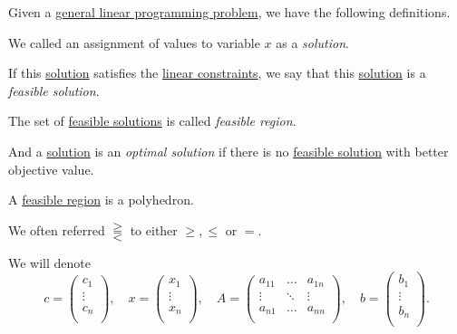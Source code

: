 Given a \hyperref[def:general-linear-programming-problem]{general linear programming problem}, we have the following definitions.
\begin{definition}\label{def:solution-of-a-general-linear-programming-problem}
	We called an assignment of values to variable \(x\) as a \emph{solution}.

	\begin{definition}\label{def:feasible-solution}
		If this \hyperref[def:solution-of-a-general-linear-programming-problem]{solution} satisfies the \hyperref[def:constraints]{linear constraints}, we say that
		this \hyperref[def:solution-of-a-general-linear-programming-problem]{solution} is a \emph{feasible solution}.
	\end{definition}

	\begin{definition}\label{def:feasible-region}
		The set of \hyperref[def:feasible-solution]{feasible solutions} is called \emph{feasible region}.
	\end{definition}

	\begin{definition}\label{def:optimal-solution}
		And a \hyperref[def:solution-of-a-general-linear-programming-problem]{solution} is an \emph{optimal solution} if there is no \hyperref[def:feasible-solution]{feasible solution}
		with better objective value.
	\end{definition}
\end{definition}

\begin{remark}
	A \hyperref[def:feasible-region]{feasible region} is a polyhedron.
\end{remark}


\begin{notation}
	We often referred \(\gtreqqless \) to either \(\geq , \leq\) or \(=\).
\end{notation}

We will denote
\[
	c= \begin{pmatrix}
		c_1    \\
		\vdots \\
		c_n    \\
	\end{pmatrix},\quad
	x = \begin{pmatrix}
		x_1    \\
		\vdots \\
		x_n    \\
	\end{pmatrix}, \quad
	A = \begin{pmatrix}
		a_{11} & \ldots & a_{1n} \\
		\vdots & \ddots & \vdots \\
		a_{n1} & \ldots & a_{nn} \\
	\end{pmatrix},\quad
	b = \begin{pmatrix}
		b_1    \\
		\vdots \\
		b_n    \\
	\end{pmatrix}.
\]

